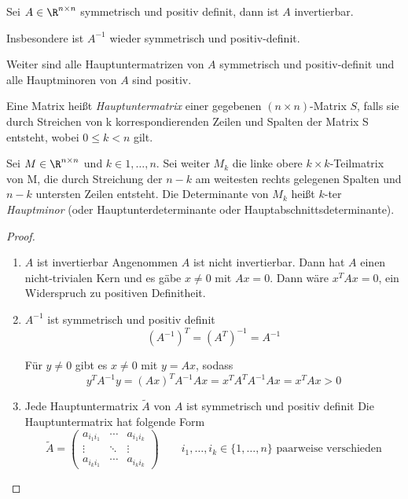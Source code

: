 \documentclass{mycourse}
\begin{document}
\begin{st}
	\label{st:3.13}
	Sei $A\in \R^{n\times n}$ symmetrisch und positiv definit, dann ist $A$ invertierbar.
	
	Insbesondere ist $A^{-1}$ wieder symmetrisch und positiv-definit.

	Weiter sind alle Hauptuntermatrizen von $A$ symmetrisch und positiv-definit und alle Hauptminoren von $A$ sind positiv.
  \begin{note}
  Eine Matrix heißt \emph{Hauptuntermatrix} einer gegebenen $(n \times n)$-Matrix
$S$, falls sie durch Streichen von k korrespondierenden Zeilen und Spalten der Matrix S
entsteht, wobei $0 \le k < n$ gilt.

  Sei $M \in \R^{n\times n}$
und $k \in {1,\dotsc, n}$. Sei weiter $M_k$ die linke obere $k \times k$-Teilmatrix von M, die durch Streichung der $n - k$ am
weitesten rechts gelegenen Spalten und $n - k$ untersten Zeilen entsteht. Die Determinante von $M_k$ heißt $k$-ter
\emph{Hauptminor} (oder Hauptunterdeterminante oder Hauptabschnittsdeterminante).
  \end{note}
	\begin{proof}
		\begin{enumerate}
			\item \begin{seg}{$A$ ist invertierbar}
					Angenommen $A$ ist nicht invertierbar.
					Dann hat $A$ einen nicht-trivialen Kern und es gäbe $x\neq 0$ mit $Ax = 0$. 
					Dann wäre $x^TAx = 0$, ein Widerspruch zu positiven Definitheit.
				\end{seg}
			\item \begin{seg}{$A^{-1}$ ist symmetrisch und positiv definit}
					\[
						(A^{-1})^T = (A^T)^{-1} = A^{-1}
					\]
				
					Für $y\neq 0$ gibt es $x\neq 0$ mit $y=Ax$, sodass
					\[
						y^TA^{-1}y = (Ax)^TA^{-1}Ax = x^TA^TA^{-1}Ax = x^TAx > 0
					\]
				\end{seg}
			\item \begin{seg}{Jede Hauptuntermatrix $\tilde A$ von $A$ ist symmetrisch und positiv definit}
				Die Hauptuntermatrix hat folgende Form
				\[
					\tilde A = \begin{pmatrix} a_{i_1i_1} & \cdots & a_{i_1i_k}\\ \vdots &\ddots & \vdots \\ a_{i_ki_1} &\cdots & a_{i_ki_k}\end{pmatrix} \qquad i_1,\dotsc,i_k \in \{1,\dotsc,n\} \text{ paarweise verschieden}
				\]
				

\end{seg}
\end{enumerate}
\end{proof}
\end{st}
\end{document}
